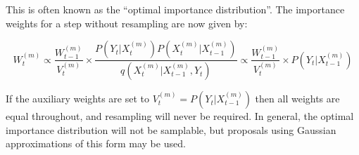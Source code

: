 This is often known as the ``optimal importance distribution''. The importance weights for a step without resampling are now given by:

\begin{equation}
W_t^{(m)} \propto \frac{ W_{t-1}^{(m)} }{ V_t^{(m)} } \times \frac{ P(Y_t|X_t^{(m)})P(X_t^{(m)}|X_{t-1}^{(m)}) }{q(X_t^{(m)}|X_{t-1}^{(m)}, Y_t)} \propto \frac{ W_{t-1}^{(m)} }{ V_t^{(m)} } \times P(Y_t|X_{t-1}^{(m)})
\label{eq:OptimalImportanceWeights}
\end{equation}

If the auxiliary weights are set to $V_t^{(m)}=P(Y_t|X_{t-1}^{(m)})$ then all weights are equal throughout, and resampling will never be required. In general, the optimal importance distribution will not be samplable, but proposals using Gaussian approximations of this form may be used.